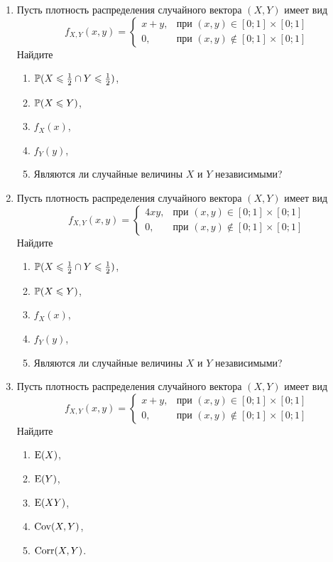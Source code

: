 \begin{enumerate}
\item Пусть плотность распределения случайного вектора $(X,Y)$ имеет вид
\[
f_{X,Y}(x,y) =
\begin{cases}
x+y, & \text{при } (x,y) \in [0;1] \times [0;1] \\
0 , & \text{при } (x,y) \not\in [0;1] \times [0;1]
\end{cases}
\]
Найдите
\begin{enumerate}
\item $\P(X \leq \frac{1}{2} \cap Y \leq \frac{1}{2})$,
\item $\P(X\leq Y)$,
\item $f_{X}(x)$,
\item $f_{Y}(y)$,
\item Являются ли случайные величины $X$ и $Y$ независимыми?
\end{enumerate}

\item Пусть плотность распределения случайного вектора $(X,Y)$ имеет вид
\[
f_{X,Y}(x,y) =
\begin{cases} 4xy, & \text{при } (x,y) \in [0;1] \times [0;1] \\
0 , & \text{при } (x,y) \not\in [0;1] \times [0;1]
\end{cases}
\]
Найдите
\begin{enumerate}
\item $\P(X \leq \frac{1}{2} \cap Y \leq \frac{1}{2})$,
\item $\P(X\leq Y)$,
\item $f_{X}(x)$,
\item $f_{Y}(y)$,
\item Являются ли случайные величины $X$ и $Y$ независимыми?
\end{enumerate}

\item Пусть плотность распределения случайного вектора $(X,Y)$ имеет вид
\[
f_{X,Y}(x,y) =
\begin{cases} x+y, & \text{при } (x,y) \in [0;1] \times [0;1] \\
0 , & \text{при } (x,y) \not\in [0;1] \times [0;1]
\end{cases}
\]
Найдите
\begin{enumerate}
\item $\E(X)$,
\item $\E(Y)$,
\item $\E(XY)$,
\item $\Cov(X,Y)$,
\item $\Corr(X,Y)$.
\end{enumerate}


\end{enumerate}
